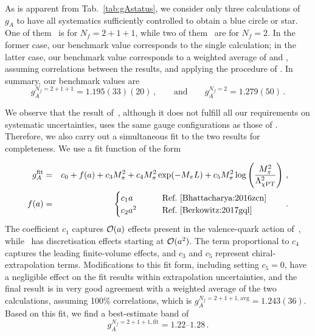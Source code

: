 As is apparent from Tab.~\ref{tab:gAstatus}, we consider 
only three calculations of $g_A$ to have all systematics
sufficiently controlled to obtain a blue circle or star.
%
One of them~\cite{Bhattacharya:2016zcn} is for $N_f=2+1+1$, while two of 
them~\cite{Capitani:2017qpc,Bali:2014nma} are for $N_f=2$.
%
In the former case, our benchmark value corresponds to the single calculation;
in the latter case, our benchmark value corresponds to a weighted average 
of \cite{Capitani:2017qpc} and \cite{Bali:2014nma}, assuming correlations
between the results, and applying the procedure of \cite{Schmelling:1994pz}.
%
In summary, our benchmark values are
\begin{equation}\label{eq:gAcriteria}
g_A^{N_f=2+1+1} = 1.195(33)(20)
\,,\qquad \mathrm{and}\qquad 
g_A^{N_f=2} = 1.279(50)\,.
\end{equation}

We observe that the result of~\cite{Berkowitz:2017gql}, although it does
not fulfill all our requirements on systematic uncertainties, uses the same 
gauge configurations as those of \cite{Bhattacharya:2016zcn}.
%
Therefore, we also carry out a simultaneous fit to the two results for
completeness.
%
We use a fit function of the form
%  

\begin{eqnarray}
g_A^{\mathrm{fit}}
&=&
c_0 +
f(a) +
c_3M_\pi^2 +
c_4M_\pi^2 \exp(-M_\pi L) +
c_5M_\pi^2 \log\left(\frac{M_\pi^2}{\Lambda_{\chi \mathrm{PT}}^2}\right)\,,
\\
f(a) &=&
\begin{cases}
  c_1a   & \qquad \text{Ref.~\cite{Bhattacharya:2016zcn}} \\
  c_2a^2 & \qquad \text{Ref.~\cite{Berkowitz:2017gql}}\\
\end{cases}
\qquad .
\end{eqnarray}
%
The coefficient $c_1$ captures ${\cal O}(a)$ effects present in the
valence-quark action of~\cite{Bhattacharya:2016zcn}, while~\cite{Berkowitz:2017gql} 
has discretisation effects starting at ${\cal O}(a^2)$. 
%
The term proportional to $c_4$ captures the leading finite-volume effects, and 
$c_3$ and $c_5$ represent chiral-extrapolation terms. 
%
Modifications to this fit form, including setting $c_5=0$, have a negligible 
effect on the fit results within extrapolation uncertainties, and the final 
result is in very good agreement with a weighted average of the two 
calculations, assuming 100\% correlations, which is 
$g_A^{N_f=2+1+1,\mathrm{avg}} = 1.243(36)$. 
%
Based on this fit, we find a best-estimate band of
\begin{equation}\label{eq:gAfit}
g_A^{N_f=2+1+1,\mathrm{fit}} = \numrange{1.22}{1.28}\,.
\end{equation}

